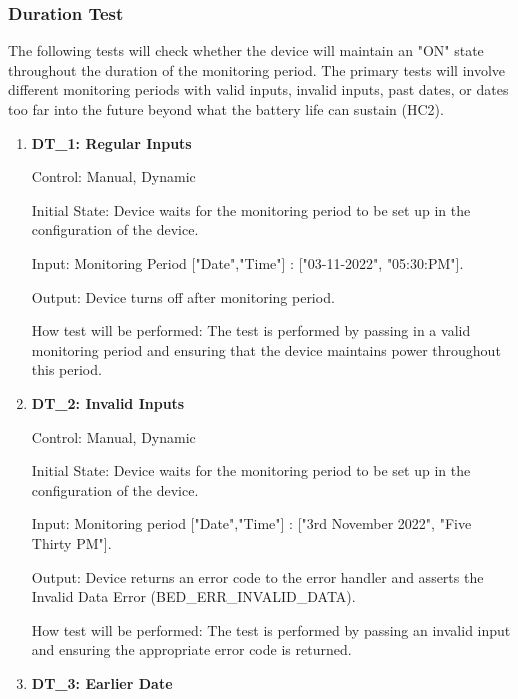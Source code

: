 \documentclass[12pt, titlepage]{article}
\begin{document}
\subsubsection{Duration Test}

The following tests will check whether the device will maintain an "ON" state throughout the duration of the monitoring period. The primary tests will involve different monitoring periods with valid inputs, invalid inputs, past dates, or dates too far into the future beyond what the battery life can sustain (HC2).
		
\begin{enumerate}

	\item{\textbf{DT\_1: Regular Inputs}\\}\label{DT1}
		
		Control: Manual, Dynamic
							
		Initial State: Device waits for the monitoring period to be set up in the configuration of the device.
							
		Input: Monitoring Period ["Date","Time"]  : ["03-11-2022", "05:30:PM"].
		
		Output: Device turns off after monitoring period.
							
		How test will be performed: The test is performed by passing in a valid monitoring period and ensuring that the device maintains power throughout this period.
					
	\item{\textbf{DT\_2: Invalid Inputs}\\}\label{DT2}
	
		Control: Manual, Dynamic
							
		Initial State: Device waits for the monitoring period to be set up in the configuration of the device.
							
		Input: Monitoring period ["Date","Time"] : ["3rd November 2022", "Five Thirty PM"].
							
		Output: Device returns an error code to the error handler and asserts the Invalid Data Error (BED\_ERR\_INVALID\_DATA).
		
		How test will be performed: The test is performed by passing an invalid input and ensuring the appropriate error code is returned.

	\item{\textbf{DT\_3: Earlier Date}\\}\label{DT3}
		

\end{enumerate}
\end{document}
